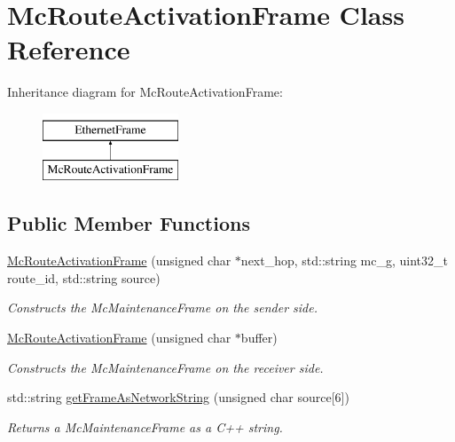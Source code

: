 \hypertarget{classMcRouteActivationFrame}{\section{Mc\-Route\-Activation\-Frame Class Reference}
\label{classMcRouteActivationFrame}
}
Inheritance diagram for Mc\-Route\-Activation\-Frame\-:\begin{figure}[H]
\begin{center}
\leavevmode
\includegraphics[height=2.000000cm]{classMcRouteActivationFrame}
\end{center}
\end{figure}
\subsection*{Public Member Functions}
\begin{DoxyCompactItemize}
\item 
\hyperlink{classMcRouteActivationFrame_a2a6ad3848eb8318aa6eb332552cc4f9a}{Mc\-Route\-Activation\-Frame} (unsigned char $\ast$next\-\_\-hop, std\-::string mc\-\_\-g, uint32\-\_\-t route\-\_\-id, std\-::string source)
\begin{DoxyCompactList}\small\item\em Constructs the Mc\-Maintenance\-Frame on the sender side. \end{DoxyCompactList}\item 
\hyperlink{classMcRouteActivationFrame_af5a50874d6ad2a5c28546fff47b5f35b}{Mc\-Route\-Activation\-Frame} (unsigned char $\ast$buffer)
\begin{DoxyCompactList}\small\item\em Constructs the Mc\-Maintenance\-Frame on the receiver side. \end{DoxyCompactList}\item 
std\-::string \hyperlink{classMcRouteActivationFrame_ad06e4b44308c0bdc6af1709665ecf4bf}{get\-Frame\-As\-Network\-String} (unsigned char source\mbox{[}6\mbox{]})
\begin{DoxyCompactList}\small\item\em Returns a Mc\-Maintenance\-Frame as a C++ string. \end{DoxyCompactList}\end{DoxyCompactItemize}
